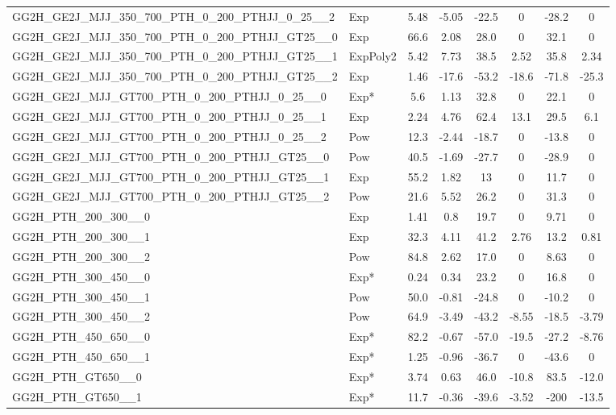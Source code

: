 \begin{table}[!h]
\begin{adjustbox}{width={\textwidth},totalheight={\textheight},keepaspectratio}
\begin{tabular}{llcccccc}
 GG2H\_GE2J\_MJJ\_350\_700\_PTH\_0\_200\_PTHJJ\_0\_25\_\_2 & Exp & 5.48 & -5.05 & -22.5 & 0 & -28.2 & 0\\
 GG2H\_GE2J\_MJJ\_350\_700\_PTH\_0\_200\_PTHJJ\_GT25\_\_0 & Exp & 66.6 & 2.08 & 28.0 & 0 & 32.1 & 0 \\
 GG2H\_GE2J\_MJJ\_350\_700\_PTH\_0\_200\_PTHJJ\_GT25\_\_1 & ExpPoly2 & 5.42 & 7.73 & 38.5 & 2.52 & 35.8 & 2.34 \\
 GG2H\_GE2J\_MJJ\_350\_700\_PTH\_0\_200\_PTHJJ\_GT25\_\_2 & Exp & 1.46 & -17.6 & -53.2 & -18.6 & -71.8 & -25.3 \\
 GG2H\_GE2J\_MJJ\_GT700\_PTH\_0\_200\_PTHJJ\_0\_25\_\_0 & Exp* & 5.6 & 1.13 & 32.8 & 0 & 22.1 & 0 \\
 GG2H\_GE2J\_MJJ\_GT700\_PTH\_0\_200\_PTHJJ\_0\_25\_\_1 & Exp & 2.24 & 4.76 & 62.4 & 13.1 & 29.5 & 6.1 \\
 GG2H\_GE2J\_MJJ\_GT700\_PTH\_0\_200\_PTHJJ\_0\_25\_\_2 & Pow & 12.3 & -2.44 & -18.7 & 0 & -13.8 & 0\\
 GG2H\_GE2J\_MJJ\_GT700\_PTH\_0\_200\_PTHJJ\_GT25\_\_0 & Pow & 40.5 & -1.69 & -27.7 & 0 & -28.9 & 0\\
 GG2H\_GE2J\_MJJ\_GT700\_PTH\_0\_200\_PTHJJ\_GT25\_\_1 & Exp & 55.2 & 1.82 & 13 & 0 & 11.7 & 0\\
 GG2H\_GE2J\_MJJ\_GT700\_PTH\_0\_200\_PTHJJ\_GT25\_\_2 & Pow & 21.6 & 5.52 & 26.2 & 0 & 31.3 & 0\\
 GG2H\_PTH\_200\_300\_\_0 & Exp & 1.41 & 0.8 & 19.7 & 0 & 9.71 & 0 \\
 GG2H\_PTH\_200\_300\_\_1 & Exp & 32.3 & 4.11 & 41.2 & 2.76 & 13.2 & 0.81\\
 GG2H\_PTH\_200\_300\_\_2 & Pow & 84.8 & 2.62 & 17.0 & 0 & 8.63 & 0 \\
 GG2H\_PTH\_300\_450\_\_0 & Exp* & 0.24 & 0.34 & 23.2 & 0 & 16.8 & 0 \\
 GG2H\_PTH\_300\_450\_\_1 & Pow & 50.0 & -0.81 & -24.8 & 0 & -10.2 & 0\\
 GG2H\_PTH\_300\_450\_\_2 & Pow & 64.9 & -3.49 & -43.2 & -8.55 & -18.5 & -3.79 \\
 GG2H\_PTH\_450\_650\_\_0 & Exp* & 82.2 & -0.67 & -57.0 & -19.5 & -27.2 & -8.76 \\
 GG2H\_PTH\_450\_650\_\_1 & Exp* & 1.25 & -0.96 & -36.7 & 0 & -43.6 & 0 \\
 GG2H\_PTH\_GT650\_\_0 & Exp* & 3.74 & 0.63 & 46.0 & -10.8 & 83.5 & -12.0\\
 GG2H\_PTH\_GT650\_\_1 & Exp* & 11.7 & -0.36 & -39.6 & -3.52 & -200 & -13.5 \\

\end{tabular}
\end{adjustbox}
\end{table}
